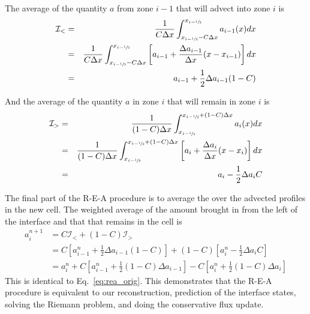 The average of the quantity $a$ from zone $i-1$ that will advect into
zone $i$ is 
\begin{eqnarray}
\mathcal{I}_< &=& \frac{1}{C \Delta x} 
   \int_{x_{i-\myhalf} - C\Delta x}^{x_{i-\myhalf}} a_{i-1}(x) dx \\
%
 &=& \frac{1}{C \Delta x} 
   \int_{x_{i-\myhalf} - C\Delta x}^{x_{i-\myhalf}}
        \left [ a_{i-1} + \frac{\Delta a_{i-1}}{\Delta x} (x - x_{i-1} ) \right ] dx  \\
 &=& a_{i-1} + \frac{1}{2} \Delta a_{i-1} (1-C)
\end{eqnarray}

And the average of the quantity $a$ in zone $i$ that will remain in zone $i$
is
\begin{eqnarray}
\mathcal{I}_> &=& \frac{1}{(1-C) \Delta x} 
   \int_{x_{i-\myhalf}}^{x_{i-\myhalf} + (1-C) \Delta x} a_{i}(x) dx \\
%
 &=& \frac{1}{(1-C) \Delta x} 
   \int_{x_{i-\myhalf}}^{x_{i-\myhalf} + (1-C)\Delta x} 
        \left [ a_{i} + \frac{\Delta a_{i}}{\Delta x} (x - x_{i} ) \right ] dx  \\
 &=& a_{i} - \frac{1}{2} \Delta a_{i} C
\end{eqnarray}

The final part of the R-E-A procedure is to average the over the 
advected profiles in the new cell.  The weighted average of the
amount brought in from the left of the interface and that that remains
in the cell is
\begin{align}
a_i^{n+1} &= C \mathcal{I}_< + (1 - C) \mathcal{I}_>  \\
          &= C \left [ a^n_{i-1} + \frac{1}{2} \Delta a_{i-1} (1 - C) \right ]
   + (1-C) \left [ a^n_i - \frac{1}{2} \Delta a_i C \right ] \\
          &= a^n_i + C \left [a^n_{i-1} + \frac{1}{2}(1 - C) \Delta a_{i-1} \right ]
           - C \left [ a^n_i + \frac{1}{2} (1-C) \Delta a_i \right ]
\end{align}          
This is identical to Eq.~\ref{eq:rea_orig}.  This demonstrates that the
R-E-A procedure is equivalent to our reconstruction, prediction of the
interface states, solving the Riemann problem, and doing the 
conservative flux update.

